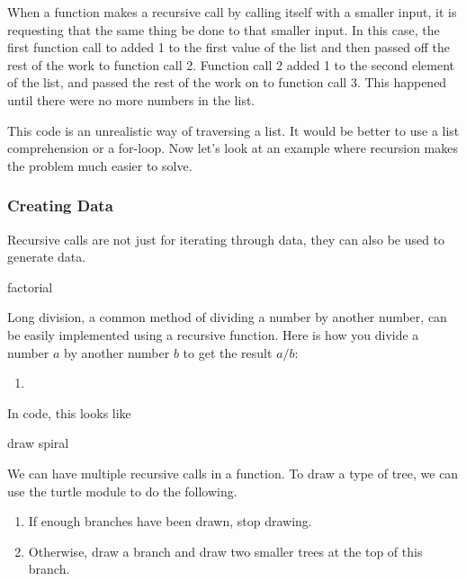 \documentclass[11pt]{cselabheader}
\begin{document}
When a function makes a recursive call by calling itself with a smaller input,
it is requesting that the same thing be done to that smaller input.
In this case, the first function call to  added 1 to the
first value of the list and then passed off the rest of the work to
function call 2. Function call 2 added 1 to the second element of the list,
and passed the rest of the work on to function call 3. This happened until
there were no more numbers in the list.

This code is an unrealistic way of traversing a list. It would be better to use
a list comprehension or a for-loop. Now let's look at an example where
recursion makes the problem much easier to solve.


\subsubsection{Creating Data}
Recursive calls are not just for iterating through data, they can also be used
to generate data.

factorial

\begin{python3code}

\end{python3code}

Long division, a common method of dividing a number by another number, can be
easily implemented using a recursive function. Here is how you divide a number
$a$ by another number $b$ to get the result $a / b$:
\begin{enumerate}
\item
\end{enumerate}

In code, this looks like

\begin{python3code}

\end{python3code}

draw spiral

\begin{python3code}

\end{python3code}

\begin{center}
\end{center}

We can have multiple recursive calls in a function. To draw a type of tree,
we can use the turtle module to do the following.
\begin{enumerate}
\item If enough branches have been drawn, stop drawing.
\item Otherwise, draw a branch and draw two smaller trees at the top
of this branch.
\end{enumerate}
\end{document}
